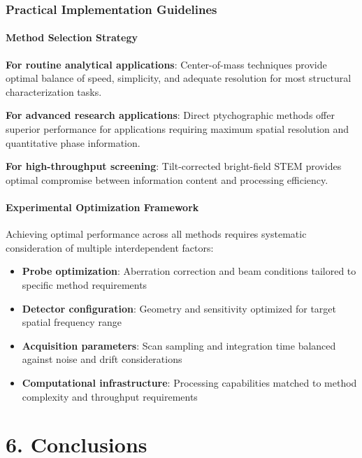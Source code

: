 \documentclass[
  letterpaper,
]{article}
\providecommand{\tightlist}{%
  \setlength{\itemsep}{0pt}\setlength{\parskip}{0pt}}
\begin{document}
\subsection{Practical Implementation
Guidelines}\label{practical-implementation-guidelines}

\subsubsection{Method Selection
Strategy}\label{method-selection-strategy}

\textbf{For routine analytical applications}: Center-of-mass techniques
provide optimal balance of speed, simplicity, and adequate resolution
for most structural characterization tasks.

\textbf{For advanced research applications}: Direct ptychographic
methods offer superior performance for applications requiring maximum
spatial resolution and quantitative phase information.

\textbf{For high-throughput screening}: Tilt-corrected bright-field STEM
provides optimal compromise between information content and processing
efficiency.

\subsubsection{Experimental Optimization
Framework}\label{experimental-optimization-framework}

Achieving optimal performance across all methods requires systematic
consideration of multiple interdependent factors:

\begin{itemize}
\tightlist
\item
  \textbf{Probe optimization}: Aberration correction and beam conditions
  tailored to specific method requirements
\item
  \textbf{Detector configuration}: Geometry and sensitivity optimized
  for target spatial frequency range
\item
  \textbf{Acquisition parameters}: Scan sampling and integration time
  balanced against noise and drift considerations
\item
  \textbf{Computational infrastructure}: Processing capabilities matched
  to method complexity and throughput requirements
\end{itemize}


\chapter{6. Conclusions}\label{conclusions-1}
\end{document}
